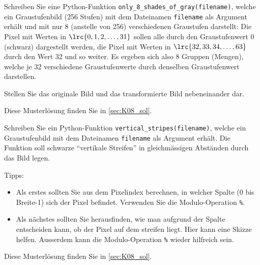 \begin{myexercise}
	Schreiben Sie eine Python-Funktion \lstinline|only_8_shades_of_gray(filename)|, welche ein Graustufenbild (256 Stufen) mit dem Dateinamen \lstinline|filename| als Argument erhält und mit nur 8 (anstelle von 256) verschiedenen Graustufen darstellt: Die Pixel mit Werten in \(\lrc{0, 1, 2, \ldots, 31}\) sollen alle durch den Graustufenwert \(0\) (schwarz) dargestellt werden, die Pixel mit Werten in \(\lrc{32,33,34,\ldots, 63}\) durch den Wert \(32\) und so weiter. Es ergeben sich also 8 Gruppen (Mengen), welche je 32 verschiedene Graustufenwerte durch denselben Graustufenwert darstellen.

	Stellen Sie das originale Bild und das transformierte Bild nebeneinander dar.
	\begin{myanswer}
		Diese Musterlösung finden Sie in \cref{sec:K08_sol}.
	\end{myanswer}
\end{myexercise}

\begin{mychallenge}
	Schreiben Sie ein Python-Funktion \lstinline|vertical_stripes(filename)|, welche ein Graustufenbild mit dem Dateinamen \lstinline|filename| als Argument erhält. Die Funktion soll schwarze \enquote{vertikale Streifen} in gleichmässigen Abständen durch das Bild legen.

	Tipps:
	\begin{itemize}
		\item Als erstes sollten Sie aus dem Pixelindex berechnen, in welcher Spalte (0 bis Breite-1) sich der Pixel befindet. Verwenden Sie die Modulo-Operation \lstinline|%|.
		\item Als nächstes sollten Sie herausfinden, wie man aufgrund der Spalte entscheiden kann, ob der Pixel auf dem streifen liegt. Hier kann eine Skizze helfen. Ausserdem kann die Modulo-Operation \lstinline|%| wieder hilfreich sein.
	\end{itemize}
	\begin{myanswer}
		Diese Musterlösung finden Sie in \cref{sec:K08_sol}.
	\end{myanswer}
\end{mychallenge}


